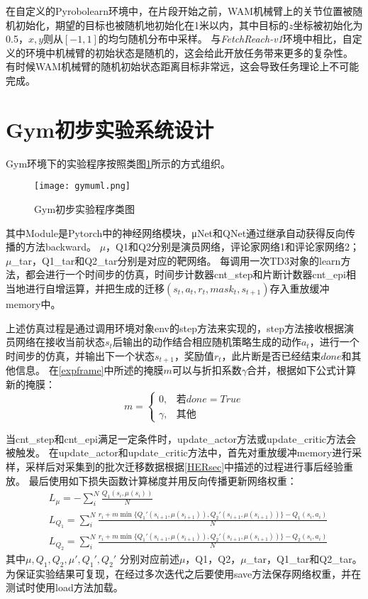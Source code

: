 在自定义的Pyrobolearn环境中，在片段开始之前，WAM机械臂上的关节位置被随机初始化，期望的目标也被随机地初始化在1米以内，其中目标的$z$坐标被初始化为0.5，$x,y$则从$[-1,1]$的均匀随机分布中采样。
与\emph{FetchReach-v1}环境中相比，自定义的环境中机械臂的初始状态是随机的，这会给此开放任务带来更多的复杂性。
有时候WAM机械臂的随机初始状态距离目标非常远，这会导致任务理论上不可能完成。

\section{Gym初步实验系统设计}

Gym环境下的实验程序按照类图\ref{gymuml}所示的方式组织。
    \begin{figure}
        \centering
        \texttt{[image: gymuml.png]}
        \caption{Gym初步实验程序类图}
        \label{gymuml}
    \end{figure}
其中Module是Pytorch中的神经网络模块，μNet和QNet通过继承自动获得反向传播的方法backward。
$\mu$，Q1和Q2分别是演员网络，评论家网络1和评论家网络2；$\mu$\_tar，Q1\_tar和Q2\_tar分别是对应的靶网络。
每调用一次TD3对象的learn方法，都会进行一个时间步的仿真，时间步计数器cnt\_step和片断计数器cnt\_epi相当地进行自增运算，并把生成的迁移$(s_t,a_t,r_t,mask_t,s_{t+1})$存入重放缓冲memory中。

上述仿真过程是通过调用环境对象env的step方法来实现的，step方法接收根据演员网络在接收当前状态$s_t$后输出的动作结合相应随机策略生成的动作$a_t$，进行一个时间步的仿真，并输出下一个状态$s_{t+1}$，奖励值$r_t$，此片断是否已经结束$done$和其他信息。
在\ref{expframe}中所述的掩膜$m$可以与折扣系数$\gamma$合并，根据如下公式计算新的掩膜：
\[
m=\begin{cases}
          0, & \text{若} done=True \\
          \gamma, & \text{其他}
\end{cases}
\]

当cnt\_step和cnt\_epi满足一定条件时，update\_actor方法或update\_critic方法会被触发。
在update\_actor和update\_critic方法中，首先对重放缓冲memory进行采样，采样后对采集到的批次迁移数据根据\ref{HERsec}中描述的过程进行事后经验重放。
最后使用如下损失函数计算梯度并用反向传播更新网络权重：
\begin{align}
    & L_\mu = -\sum_i^N\frac{Q_1(s_i, \mu(s_i))}{N} \\
    & L_{Q_1} = \sum_i^N\frac{r_i + m \min\{Q_1'(s_{i+1},\mu(s_{i+1})), Q_2'(s_{i+1},\mu(s_{i+1}))\} - Q_1(s_i,a_i)}{N}\\
    & L_{Q_2} = \sum_i^N\frac{r_i + m \min\{Q_1'(s_{i+1},\mu(s_{i+1})), Q_2'(s_{i+1},\mu(s_{i+1}))\} - Q_2(s_i,a_i)}{N}
\end{align}
其中$\mu, Q_1, Q_2, \mu', Q_1',Q_2'$ 分别对应前述$\mu$，Q1，Q2，$\mu$\_tar，Q1\_tar和Q2\_tar。
为保证实验结果可复现，在经过多次迭代之后要使用save方法保存网络权重，并在测试时使用load方法加载。

